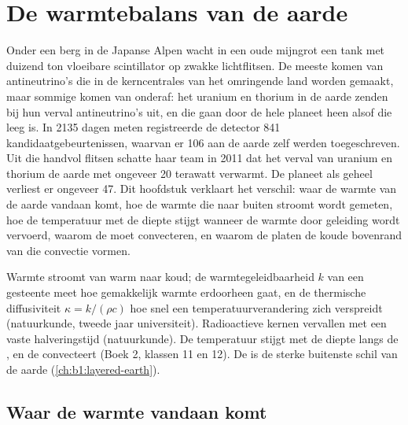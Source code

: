 \chapter{De warmtebalans van de aarde}\label{ch:b1:heat-budget}

Onder een berg in de Japanse Alpen wacht in een oude mijngrot een tank met duizend ton vloeibare scintillator op zwakke lichtflitsen. De meeste komen van antineutrino's die in de kerncentrales van het omringende land worden gemaakt, maar sommige komen van onderaf: het uranium en thorium in de aarde zenden bij hun verval antineutrino's uit, en die gaan door de hele planeet heen alsof die leeg is. In 2135 dagen meten registreerde de detector 841 kandidaatgebeurtenissen, waarvan er 106 aan de aarde zelf werden toegeschreven. Uit die handvol flitsen schatte haar team in 2011 dat het verval van uranium en thorium de aarde met ongeveer 20 terawatt verwarmt. De planeet als geheel verliest er ongeveer 47. Dit hoofdstuk verklaart het verschil: waar de warmte van de aarde vandaan komt, hoe de warmte die naar buiten stroomt wordt gemeten, hoe de temperatuur met de diepte stijgt wanneer de warmte door geleiding wordt vervoerd, waarom de  moet convecteren, en waarom de platen de koude bovenrand van die convectie vormen.

\begin{recall}
Warmte stroomt van warm naar koud; de warmtegeleidbaarheid $k$ van een gesteente meet hoe gemakkelijk warmte erdoorheen gaat, en de thermische diffusiviteit $\kappa = k/(\rho c)$ hoe snel een temperatuurverandering zich verspreidt (natuurkunde, tweede jaar universiteit). Radioactieve kernen vervallen met een vaste halveringstijd (natuurkunde). De temperatuur stijgt met de diepte langs de , en de  convecteert (Boek 2, klassen 11 en 12). De  is de sterke buitenste schil van de aarde (\cref{ch:b1:layered-earth}).
\end{recall}

\section{Waar de warmte vandaan komt}

